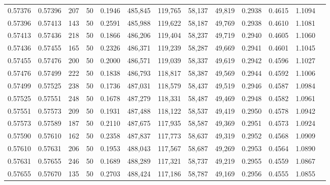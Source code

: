 \begin{tabular}{rrrrrrrrrrrrr}
0.57376 & 0.57396 &   207 &  50 &                                     0.1946 & 485,845 & 119,765 &  58,137 &  49,819 & 0.2938 & 0.4615 & 1.1094 \\
0.57396 & 0.57413 &   143 &  50 &                                     0.2591 & 485,988 & 119,622 &  58,187 &  49,769 & 0.2938 & 0.4610 & 1.1081 \\
0.57413 & 0.57436 &   218 &  50 &                                     0.1866 & 486,206 & 119,404 &  58,237 &  49,719 & 0.2940 & 0.4605 & 1.1060 \\
0.57436 & 0.57455 &   165 &  50 &                                     0.2326 & 486,371 & 119,239 &  58,287 &  49,669 & 0.2941 & 0.4601 & 1.1045 \\
0.57455 & 0.57476 &   200 &  50 &                                     0.2000 & 486,571 & 119,039 &  58,337 &  49,619 & 0.2942 & 0.4596 & 1.1027 \\
0.57476 & 0.57499 &   222 &  50 &                                     0.1838 & 486,793 & 118,817 &  58,387 &  49,569 & 0.2944 & 0.4592 & 1.1006 \\
0.57499 & 0.57525 &   238 &  50 &                                     0.1736 & 487,031 & 118,579 &  58,437 &  49,519 & 0.2946 & 0.4587 & 1.0984 \\
0.57525 & 0.57551 &   248 &  50 &                                     0.1678 & 487,279 & 118,331 &  58,487 &  49,469 & 0.2948 & 0.4582 & 1.0961 \\
0.57551 & 0.57573 &   209 &  50 &                                     0.1931 & 487,488 & 118,122 &  58,537 &  49,419 & 0.2950 & 0.4578 & 1.0942 \\
0.57573 & 0.57589 &   187 &  50 &                                     0.2110 & 487,675 & 117,935 &  58,587 &  49,369 & 0.2951 & 0.4573 & 1.0924 \\
0.57590 & 0.57610 &   162 &  50 &                                     0.2358 & 487,837 & 117,773 &  58,637 &  49,319 & 0.2952 & 0.4568 & 1.0909 \\
0.57610 & 0.57631 &   206 &  50 &                                     0.1953 & 488,043 & 117,567 &  58,687 &  49,269 & 0.2953 & 0.4564 & 1.0890 \\
0.57631 & 0.57655 &   246 &  50 &                                     0.1689 & 488,289 & 117,321 &  58,737 &  49,219 & 0.2955 & 0.4559 & 1.0867 \\
0.57655 & 0.57670 &   135 &  50 &                                     0.2703 & 488,424 & 117,186 &  58,787 &  49,169 & 0.2956 & 0.4555 & 1.0855 \\

\end{tabular}
